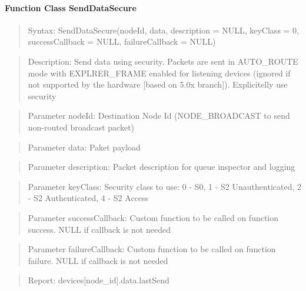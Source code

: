 \paragraph{Function Class SendDataSecure}
\begin{quote}Syntax: SendDataSecure(nodeId, data, description = NULL, keyClass = 0, successCallback = NULL, failureCallback = NULL)\end{quote}
\begin{quote}Description: Send data using security. Packets are sent in AUTO\_ROUTE mode with EXPLRER\_FRAME enabled for listening devices (ignored if not supported by the hardware [based on 5.0x branch]). Explicitelly use security\end{quote}
\begin{quote}Parameter nodeId: Destination Node Id (NODE\_BROADCAST to send non-routed broadcast packet)\end{quote}
\begin{quote}Parameter data: Paket payload\end{quote}
\begin{quote}Parameter description: Packet description for queue inspector and logging\end{quote}
\begin{quote}Parameter keyClass: Security class to use: 0 - S0, 1 - S2 Unauthenticated, 2 - S2 Authenticated, 4 - S2 Access\end{quote}
\begin{quote}Parameter successCallback: Custom function to be called on function success. NULL if callback is not needed\end{quote}
\begin{quote}Parameter failureCallback: Custom function to be called on function failure. NULL if callback is not needed\end{quote}
\begin{quote}Report: devices[node\_id].data.lastSend\end{quote}

